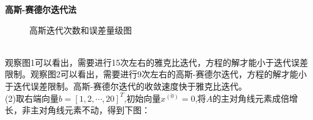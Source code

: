 \documentclass[a4paper,11pt,UTF8]{article}%
\theoremstyle{plain}
\begin{document}
	\indent \textbf{高斯-赛德尔迭代法}\\
	\begin{figure}[!h]
		\centering
		\hfill
		\newline
		\hfill
		\caption{高斯迭代次数和误差量级图}
	\end{figure}\\
\indent 观察图1可以看出，需要进行15次左右的雅克比迭代，方程的解才能小于迭代误差限制。观察图2可以看出，需要进行9次左右的高斯-赛德尔迭代，方程的解才能小于迭代误差限制。高斯-赛德尔迭代的收敛速度快于雅克比迭代。
	\vspace{10pt}\\
	\indent(2)取右端向量$b=\left[1,2,\cdots,20\right]^T$,初始向量$x^{\left(0\right)}=0$,将$A$的主对角线元素成倍增长，非主对角线元素不动，得到下图：\\
\end{document}
